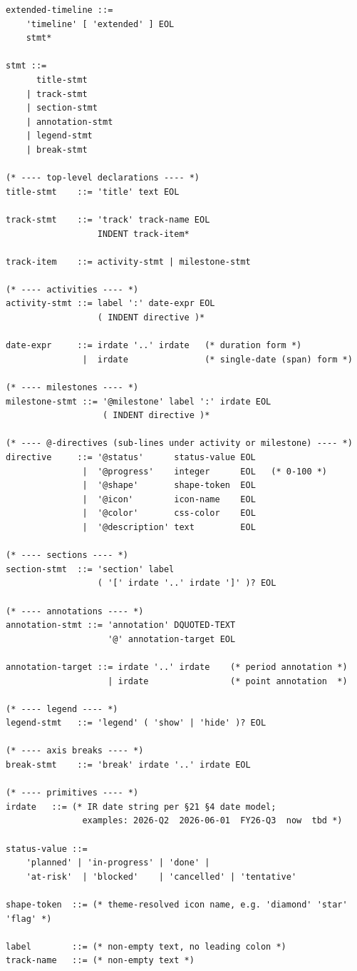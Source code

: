 \begin{lstlisting}[caption={Extended Timeline EBNF sketch}]
extended-timeline ::=
    'timeline' [ 'extended' ] EOL
    stmt*

stmt ::=
      title-stmt
    | track-stmt
    | section-stmt
    | annotation-stmt
    | legend-stmt
    | break-stmt

(* ---- top-level declarations ---- *)
title-stmt    ::= 'title' text EOL

track-stmt    ::= 'track' track-name EOL
                  INDENT track-item*

track-item    ::= activity-stmt | milestone-stmt

(* ---- activities ---- *)
activity-stmt ::= label ':' date-expr EOL
                  ( INDENT directive )*

date-expr     ::= irdate '..' irdate   (* duration form *)
               |  irdate               (* single-date (span) form *)

(* ---- milestones ---- *)
milestone-stmt ::= '@milestone' label ':' irdate EOL
                   ( INDENT directive )*

(* ---- @-directives (sub-lines under activity or milestone) ---- *)
directive     ::= '@status'      status-value EOL
               |  '@progress'    integer      EOL   (* 0-100 *)
               |  '@shape'       shape-token  EOL
               |  '@icon'        icon-name    EOL
               |  '@color'       css-color    EOL
               |  '@description' text         EOL

(* ---- sections ---- *)
section-stmt  ::= 'section' label
                  ( '[' irdate '..' irdate ']' )? EOL

(* ---- annotations ---- *)
annotation-stmt ::= 'annotation' DQUOTED-TEXT
                    '@' annotation-target EOL

annotation-target ::= irdate '..' irdate    (* period annotation *)
                    | irdate                (* point annotation  *)

(* ---- legend ---- *)
legend-stmt   ::= 'legend' ( 'show' | 'hide' )? EOL

(* ---- axis breaks ---- *)
break-stmt    ::= 'break' irdate '..' irdate EOL

(* ---- primitives ---- *)
irdate   ::= (* IR date string per §21 §4 date model;
               examples: 2026-Q2  2026-06-01  FY26-Q3  now  tbd *)

status-value ::=
    'planned' | 'in-progress' | 'done' |
    'at-risk'  | 'blocked'    | 'cancelled' | 'tentative'

shape-token  ::= (* theme-resolved icon name, e.g. 'diamond' 'star' 'flag' *)

label        ::= (* non-empty text, no leading colon *)
track-name   ::= (* non-empty text *)
\end{lstlisting}

